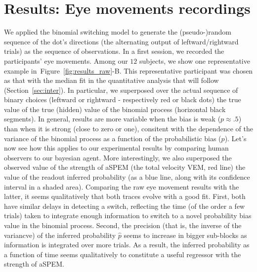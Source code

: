 \documentclass[profile,final,english, draft]{article}%
\newcommand{\seeFig}[1]{Figure~\ref{fig:#1}}
\newcommand{\seeSec}[1]{Section~\ref{sec:#1}}
\begin{document}
\section{Results: Eye movements recordings}
\label{sec:eye_rec}
We applied the binomial switching model
to generate the (pseudo-)random sequence of
the dot's directions (the alternating output of leftward/rightward trials)
as the sequence of observations.
In a first session, we recorded the participants' eye movements.
Among our $12$ subjects,
we show one representative example in~\seeFig{results_raw}-B.
This representative participant was chosen as that
with the median fit in the quantitative analysis
that will follow (\seeSec{inter}).
In particular, we superposed over the actual sequence of binary choices
(leftward or rightward - respectively red or black dots)
the true value of the true (hidden) value
of the binomial process (horizontal black segments).
In general, results are more variable when the bias is weak ($p\approx .5$)
than when it is strong (close to zero or one),
consitent with the dependence of the variance of the binomial process
as a function of the probabilistic bias ($p$).
Let's now see how this applies to our experimental results
by comparing human observers to our bayesian agent.
More interestingly, we also superposed
the observed value of the strength of aSPEM
(the total velocity VEM, red line)
the value of the readout inferred probability
(as a blue line, along with its confidence interval in a shaded area).
Comparing the raw eye movement results with the latter,
it seems qualitatively that both traces evolve with a good fit.
First, both have similar delays in detecting a switch,
reflecting the time (of the order a few trials) taken to integrate enough information
to switch to a novel probability bias value in the binomial process.
Second, the precision (that is, the inverse of the variancve)
of the inferred probability $\hat{p}$ seems to increase
in bigger sub-blocks as information is integrated over more trials.
As a result, the inferred probability as a function of time
seems qualitatively to constitute a useful regressor
with the strength of aSPEM.
\end{document}
